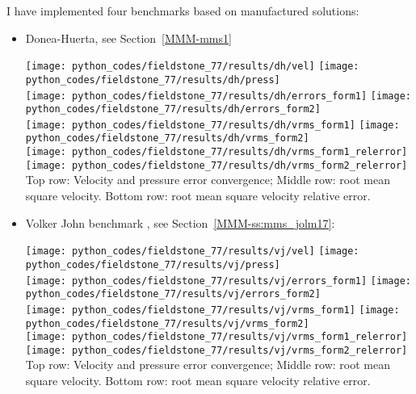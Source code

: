 I have implemented four benchmarks based on manufactured solutions:
\begin{itemize}
\item Donea-Huerta, see Section~\ref{MMM-mms1}

\begin{center}
\texttt{[image: python\_codes/fieldstone\_77/results/dh/vel]}
\texttt{[image: python\_codes/fieldstone\_77/results/dh/press]}\\
\texttt{[image: python\_codes/fieldstone\_77/results/dh/errors\_form1]}
\texttt{[image: python\_codes/fieldstone\_77/results/dh/errors\_form2]}\\
\texttt{[image: python\_codes/fieldstone\_77/results/dh/vrms\_form1]}
\texttt{[image: python\_codes/fieldstone\_77/results/dh/vrms\_form2]}\\
\texttt{[image: python\_codes/fieldstone\_77/results/dh/vrms\_form1\_relerror]}
\texttt{[image: python\_codes/fieldstone\_77/results/dh/vrms\_form2\_relerror]}\\
{\captionfont Top row: Velocity and pressure error convergence; 
Middle row: root mean square velocity. 
Bottom row: root mean square velocity relative error.}
\end{center}

\item Volker John benchmark \cite{jolm17}, see Section~\ref{MMM-ss:mms_jolm17}:

\begin{center}
\texttt{[image: python\_codes/fieldstone\_77/results/vj/vel]}
\texttt{[image: python\_codes/fieldstone\_77/results/vj/press]}\\
\texttt{[image: python\_codes/fieldstone\_77/results/vj/errors\_form1]}
\texttt{[image: python\_codes/fieldstone\_77/results/vj/errors\_form2]}\\
\texttt{[image: python\_codes/fieldstone\_77/results/vj/vrms\_form1]}
\texttt{[image: python\_codes/fieldstone\_77/results/vj/vrms\_form2]}\\
\texttt{[image: python\_codes/fieldstone\_77/results/vj/vrms\_form1\_relerror]}
\texttt{[image: python\_codes/fieldstone\_77/results/vj/vrms\_form2\_relerror]}\\
{\captionfont Top row: Velocity and pressure error convergence; 
Middle row: root mean square velocity. 
Bottom row: root mean square velocity relative error.}
\end{center}


\end{itemize}
